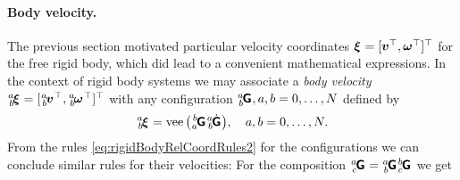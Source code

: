 \paragraph{Body velocity.}
The previous section motivated particular velocity coordinates $\bodyVel{}{} = [\v^\top, \w^\top]^\top$ for the free rigid body, which did lead to a convenient mathematical expressions.
In the context of rigid body systems we may associate a \textit{body velocity} $\bodyVel{\BidxI}{\BidxII} = [\bodyLinVel{\BidxI}{\BidxII}^\top, \bodyAngVel{\BidxI}{\BidxII}^\top]^\top$ with any configuration $\bodyHomoCoord{\BidxI}{\BidxII}, \BidxI,\BidxII = 0,\ldots,\numRigidBodies$ defined by 
\begin{align}\label{eq:DefBodyVelocityMulti}
 \bodyVel{\BidxI}{\BidxII} = \veeOp\big(\bodyHomoCoord{\BidxII}{\BidxI} \bodyHomoCoordd{\BidxI}{\BidxII}{}{} \big), \quad \BidxI,\BidxII = 0,\ldots,\numRigidBodies.
\end{align}
From the rules \eqref{eq:rigidBodyRelCoordRules2} for the configurations we can conclude similar rules for their velocities:
For the composition $\bodyHomoCoord{\BidxI}{\BidxIII}{}{} = \bodyHomoCoord{\BidxI}{\BidxII}{}{} \bodyHomoCoord{\BidxII}{\BidxIII}{}{}$ we get
